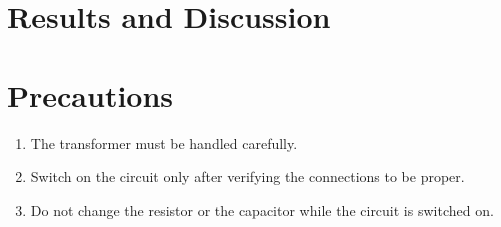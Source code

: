 \section{Results and Discussion}

\section{Precautions}
\begin{enumerate}
    \item The transformer must be handled carefully.
    \item Switch on the circuit only after verifying the connections to be proper.
    \item Do not change the resistor or the capacitor while the circuit is switched on.
\end{enumerate}
